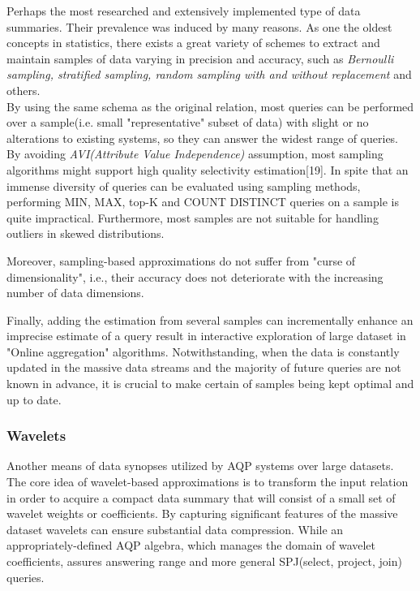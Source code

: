 \documentclass[10pt, conference, compsocconf]{IEEEtran}
\begin{document}
Perhaps the most researched and extensively implemented type of data summaries. Their prevalence was induced by many reasons. As one the oldest concepts in statistics, there exists a great variety of schemes to extract and maintain samples of data varying in precision and accuracy, such as \textit{Bernoulli sampling, stratified sampling, random sampling with and without replacement} and others. \\
By using the same schema as the original relation, most queries can be performed over a sample(i.e. small "representative" subset of data) with slight or no alterations to existing systems, so they can answer the widest range of queries. By avoiding \textit{AVI(Attribute Value Independence)} assumption, most sampling algorithms might support high quality selectivity estimation[19]. In spite that an immense diversity of queries can be evaluated using sampling methods, performing MIN, MAX, top-K and COUNT DISTINCT queries on a sample is quite impractical. Furthermore, most samples are not suitable for handling outliers in skewed distributions. 

Moreover, sampling-based approximations do not suffer from "curse of dimensionality", i.e., their accuracy does not deteriorate with the increasing number of data dimensions. 

Finally, adding the estimation from several samples can incrementally enhance an imprecise estimate of a query result in interactive exploration of large dataset in "Online aggregation" algorithms. Notwithstanding, when the data is constantly updated in the massive data streams and the majority of future queries are not known in advance, it is crucial to make certain of samples being kept optimal and up to date. \\

\subsubsection{\textbf{Wavelets}}
Another means of data synopses utilized by AQP systems over large datasets. The core idea of wavelet-based approximations is to transform the input relation in order to acquire a compact data summary that will consist of a small set of wavelet weights or coefficients. By capturing significant features of the massive dataset wavelets can ensure substantial data compression. While an appropriately-defined AQP algebra, which manages the domain of wavelet coefficients, assures answering range and more general SPJ(select, project, join) queries. 
\end{document}
